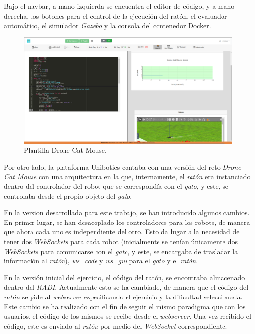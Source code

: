 \documentclass[a4paper, 12pt]{book}
\begin{document}
Bajo el navbar, a mano izquierda se encuentra el editor de código, y a mano derecha, los botones para el control de la ejecución del ratón, el evaluador automático, el simulador \emph{Gazebo} y la consola del contenedor Docker.


\begin{figure}[H]
	\centering
    \includegraphics[width=15cm]{img/drone_cat_mouse.png}
    \caption{Plantilla Drone Cat Mouse.}
    \label{figura:keyhandler}
\end{figure}

Por otro lado, la plataforma Unibotics contaba con una versión del reto \emph{Drone Cat Mouse} con una arquitectura en la que, internamente, el \emph{ratón} era instanciado dentro del controlador del robot que se correspondía con el \emph{gato}, y este, se controlaba desde el propio objeto del \emph{gato}.

En la version desarrollada para este trabajo, se han introducido algunos cambios. En primer lugar, se han desacoplado los controladores para los robots, de manera que ahora cada uno es independiente del otro. Esto da lugar a la necesidad de tener dos \emph{WebSockets} para cada robot (inicialmente se tenían únicamente dos \emph{WebSockets} para comunicarse con el \emph{gato}, y este, se encargaba de trasladar la información al \emph{ratón}), \emph{ws\_code} y \emph{ws\_gui} para el \emph{gato} y el \emph{ratón}.

En la versión inicial del ejercicio, el código del ratón, se encontraba almacenado dentro del \emph{RADI}. Actualmente esto se ha cambiado, de manera que el código del \emph{ratón} se pide al \emph{webserver} especificando el ejercicio y la dificultad seleccionada. Este cambio se ha realizado con el fin de seguir el mismo paradigma que con los usuarios, el código de los mismos se recibe desde el \emph{webserver}. Una vez recibido el código, este es enviado al \emph{ratón} por medio del \emph{WebSocket} correspondiente.
\end{document}

